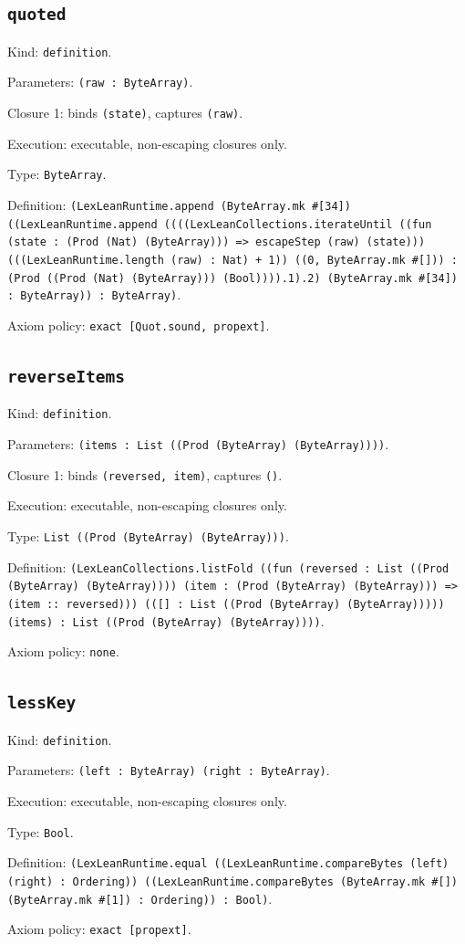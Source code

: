 \documentclass[11pt]{article}
\begin{document}
\subsection*{\texttt{quoted}}
\noindent Kind: \texttt{definition}.\par
\noindent Parameters: \texttt{(raw : ByteArray)}.\par
\noindent Closure 1: binds \texttt{(state)}, captures \texttt{(raw)}.\par
\noindent Execution: executable, non-escaping closures only.\par
\noindent Type: \texttt{ByteArray}.\par
\noindent Definition: \texttt{(LexLeanRuntime.append (ByteArray.mk \#[34]) ((LexLeanRuntime.append ((((LexLeanCollections.iterateUntil ((fun (state : (Prod (Nat) (ByteArray))) => escapeStep (raw) (state))) (((LexLeanRuntime.length (raw) : Nat) + 1)) ((0, ByteArray.mk \#[])) : (Prod ((Prod (Nat) (ByteArray))) (Bool)))).1).2) (ByteArray.mk \#[34]) : ByteArray)) : ByteArray)}.\par
\noindent Axiom policy: \texttt{exact [Quot.sound, propext]}.\par
\subsection*{\texttt{reverseItems}}
\noindent Kind: \texttt{definition}.\par
\noindent Parameters: \texttt{(items : List ((Prod (ByteArray) (ByteArray))))}.\par
\noindent Closure 1: binds \texttt{(reversed, item)}, captures \texttt{()}.\par
\noindent Execution: executable, non-escaping closures only.\par
\noindent Type: \texttt{List ((Prod (ByteArray) (ByteArray)))}.\par
\noindent Definition: \texttt{(LexLeanCollections.listFold ((fun (reversed : List ((Prod (ByteArray) (ByteArray)))) (item : (Prod (ByteArray) (ByteArray))) => (item :: reversed))) (([] : List ((Prod (ByteArray) (ByteArray))))) (items) : List ((Prod (ByteArray) (ByteArray))))}.\par
\noindent Axiom policy: \texttt{none}.\par
\subsection*{\texttt{lessKey}}
\noindent Kind: \texttt{definition}.\par
\noindent Parameters: \texttt{(left : ByteArray) (right : ByteArray)}.\par
\noindent Execution: executable, non-escaping closures only.\par
\noindent Type: \texttt{Bool}.\par
\noindent Definition: \texttt{(LexLeanRuntime.equal ((LexLeanRuntime.compareBytes (left) (right) : Ordering)) ((LexLeanRuntime.compareBytes (ByteArray.mk \#[]) (ByteArray.mk \#[1]) : Ordering)) : Bool)}.\par
\noindent Axiom policy: \texttt{exact [propext]}.\par
\end{document}
